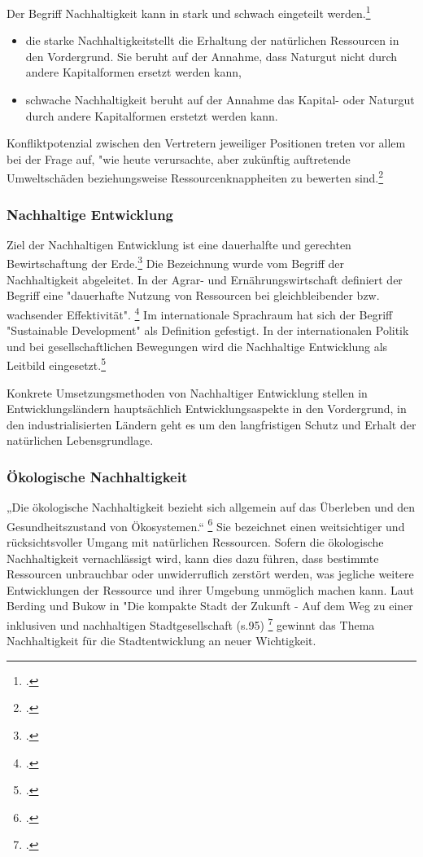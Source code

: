 \documentclass{scrartcl}
\begin{document}
\hfill \break
Der Begriff Nachhaltigkeit kann in stark und schwach eingeteilt werden.\footcite{Nachhaltigkeit}


\begin{itemize}
\item die starke Nachhaltigkeitstellt die Erhaltung der natürlichen Ressourcen in den Vordergrund. Sie beruht auf der Annahme, dass Naturgut nicht durch andere Kapitalformen ersetzt werden kann,
\item schwache Nachhaltigkeit beruht auf der Annahme das Kapital- oder Naturgut durch andere Kapitalformen erstetzt werden kann.
\end{itemize}
Konfliktpotenzial zwischen den Vertretern jeweiliger Positionen treten vor allem bei der Frage auf, "wie heute verursachte, aber zukünftig auftretende Umweltschäden beziehungsweise Ressourcenknappheiten zu bewerten sind.\footcite{NachhaltigeBrockhaus.de}



\subsubsection{Nachhaltige Entwicklung}
  Ziel der Nachhaltigen Entwicklung ist eine dauerhalfte und gerechten Bewirtschaftung der Erde.\footcite{NachhaltigeBrockhaus.de} Die Bezeichnung wurde vom Begriff der Nachhaltigkeit abgeleitet. In der Agrar- und Ernährungswirtschaft definiert der Begriff eine "dauerhafte Nutzung von Ressourcen bei gleichbleibender bzw. wachsender Effektivität". \footcite{oppenhauser2010nachhaltigkeit} Im internationale Sprachraum hat sich der Begriff "Sustainable Development" als Definition gefestigt. In der internationalen Politik und bei gesellschaftlichen Bewegungen wird die Nachhaltige Entwicklung als Leitbild eingesetzt.\footcite{oppenhauser2010nachhaltigkeit}
 
 Konkrete Umsetzungsmethoden von Nachhaltiger Entwicklung stellen in Entwicklungsländern hauptsächlich Entwicklungsaspekte in den Vordergrund, in den industrialisierten Ländern geht es um den langfristigen Schutz und Erhalt der natürlichen Lebensgrundlage. 



\subsubsection{Ökologische Nachhaltigkeit}
„Die ökologische Nachhaltigkeit bezieht sich allgemein auf das Überleben und den Gesundheitszustand von Ökosystemen.“ \footcite{DefinitionWirtschaftslexikonc}  Sie bezeichnet einen weitsichtiger und rücksichtsvoller Umgang mit natürlichen Ressourcen. Sofern die ökologische Nachhaltigkeit vernachlässigt wird, kann dies dazu führen, dass bestimmte Ressourcen unbrauchbar oder unwiderruflich zerstört werden, was jegliche weitere Entwicklungen der Ressource und ihrer Umgebung unmöglich machen kann. Laut Berding und Bukow in "Die kompakte Stadt der Zukunft - Auf dem Weg zu einer inklusiven und nachhaltigen Stadtgesellschaft (s.95) \footcite{BerdingWolf-DietrichBukowKarinCudakHrsgDieStadtgesellschaft} gewinnt das Thema Nachhaltigkeit für die Stadtentwicklung an neuer Wichtigkeit. 
\end{document}
